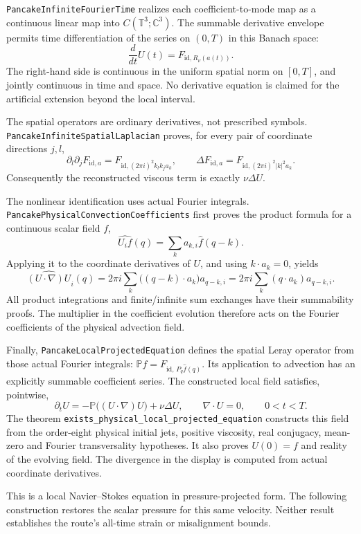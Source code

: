 \documentclass[11pt]{article}
\theoremstyle{definition}
\begin{document}
\texttt{PancakeInfiniteFourierTime} realizes each coefficient-to-mode
map as a continuous linear map into $C(\mathbb T^3;\mathbb C^3)$.
The summable derivative envelope permits time differentiation of the
series on $(0,T)$ in this Banach space:
\[
 \frac{d}{dt}U(t)=F_{\mathrm{id},R_\nu(a(t))}.
\]
The right-hand side is continuous in the uniform spatial norm on $[0,T]$,
and jointly continuous in time and space. No derivative equation is
claimed for the artificial extension beyond the local interval.

The spatial operators are ordinary derivatives, not prescribed symbols.
\texttt{PancakeInfiniteSpatialLaplacian} proves, for every pair of coordinate
directions $j,l$,
\[
 \partial_l\partial_jF_{\mathrm{id},a}
   =F_{\mathrm{id},(2\pi i)^2k_lk_j a_k},\qquad
 \Delta F_{\mathrm{id},a}
   =F_{\mathrm{id},(2\pi i)^2|k|^2 a_k}.
\]
Consequently the reconstructed viscous term is exactly $\nu\Delta U$.

The nonlinear identification uses actual Fourier integrals.
\texttt{PancakePhysicalConvectionCoefficients} first proves the product
formula for a continuous scalar field $f$,
\[
 \widehat{U_i f}(q)=\sum_k a_{k,i}\widehat f(q-k).
\]
Applying it to the coordinate derivatives of $U$, and using
$k\cdot a_k=0$, yields
\[
 \widehat{(U\cdot\nabla)U}_i(q)
  =2\pi i\sum_k\bigl((q-k)\cdot a_k\bigr)a_{q-k,i}
  =2\pi i\sum_k(q\cdot a_k)a_{q-k,i}.
\]
All product integrations and finite/infinite sum exchanges have their
summability proofs. The multiplier in the coefficient evolution therefore
acts on the Fourier coefficients of the physical advection field.

Finally, \texttt{PancakeLocalProjectedEquation} defines the spatial Leray
operator from those actual Fourier integrals:
$\mathbb P f=F_{\mathrm{id},\,P_q\widehat f(q)}$.
Its application to advection has an explicitly summable coefficient series.
The constructed local field satisfies, pointwise,
\[
 \boxed{\quad
 \partial_t U=-\mathbb P\bigl((U\cdot\nabla)U\bigr)+\nu\Delta U,\qquad
 \nabla\cdot U=0,\qquad 0<t<T.
 \quad}
\]
The theorem
\texttt{exists\_physical\_local\_projected\_equation}
constructs this field from the order-eight physical initial jets, positive
viscosity, real conjugacy, mean-zero and Fourier transversality hypotheses.
It also proves $U(0)=f$ and reality of the evolving field. The divergence in
the display is computed from actual coordinate derivatives.

This is a local Navier--Stokes equation in pressure-projected form.
The following construction restores the scalar pressure for this same
velocity. Neither result establishes the route's all-time strain or
misalignment bounds.
\end{document}
